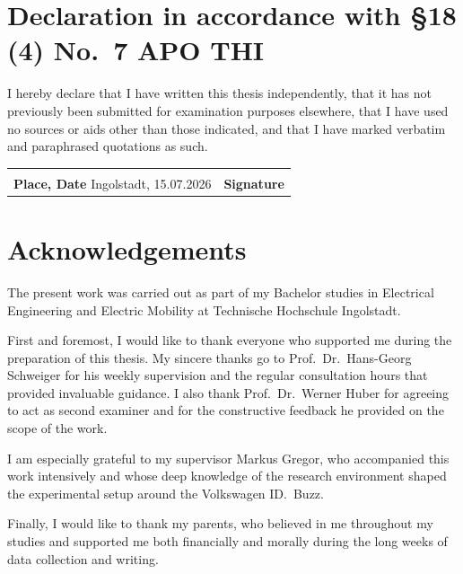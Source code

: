 \documentclass[11pt,a4paper,oneside,parskip=half]{scrreprt}
\begin{document}
\chapter*{Declaration in accordance with \S18 (4) No.~7 APO THI}
\thispagestyle{plain}

\noindent I hereby declare that I have written this thesis independently, that it has not previously been submitted for examination purposes elsewhere, that I have used no sources or aids other than those indicated, and that I have marked verbatim and paraphrased quotations as such.

\vspace{2.5cm}

\noindent
\begin{tabular}{@{}p{7cm}p{7cm}@{}}
\hrulefill & \hrulefill \\[-2pt]
\textbf{Place, Date} \hfill Ingolstadt, 15.07.2026 & \textbf{Signature} \\
\end{tabular}

\chapter*{Acknowledgements}
\thispagestyle{plain}

The present work was carried out as part of my Bachelor studies in Electrical Engineering and Electric Mobility at Technische Hochschule Ingolstadt.

First and foremost, I would like to thank everyone who supported me during the preparation of this thesis. My sincere thanks go to Prof.\ Dr.\ Hans-Georg Schweiger for his weekly supervision and the regular consultation hours that provided invaluable guidance. I also thank Prof.\ Dr.\ Werner Huber for agreeing to act as second examiner and for the constructive feedback he provided on the scope of the work.

I am especially grateful to my supervisor Markus Gregor, who accompanied this work intensively and whose deep knowledge of the research environment shaped the experimental setup around the Volkswagen ID.~Buzz.

Finally, I would like to thank my parents, who believed in me throughout my studies and supported me both financially and morally during the long weeks of data collection and writing.
\end{document}
